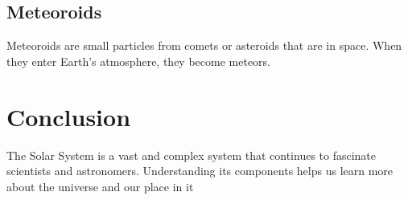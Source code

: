\documentclass{article}
\begin{document}
\subsection{Meteoroids}
Meteoroids are small particles from comets or asteroids that are in space. When they enter Earth's atmosphere, they become meteors.

\section{Conclusion}
The Solar System is a vast and complex system that continues to fascinate scientists and astronomers. Understanding its components helps us learn more about the universe and our place in it
\end{document}
